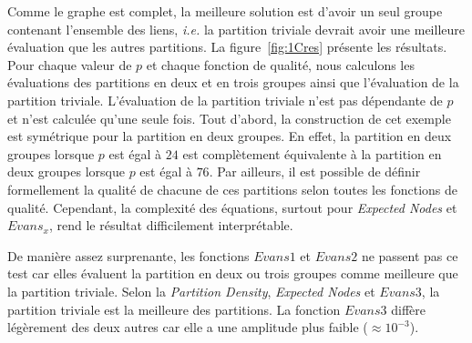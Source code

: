 Comme le graphe est complet, la meilleure solution est d'avoir un seul groupe contenant l'ensemble des liens, \textit{i.e.} la partition triviale devrait avoir une meilleure évaluation que les autres partitions.
La figure~\ref{fig:1Cres} présente les résultats.
Pour chaque valeur de $p$ et chaque fonction de qualité, nous calculons les évaluations des partitions en deux et en trois groupes ainsi que l'évaluation de la partition triviale.
L'évaluation de la partition triviale n'est pas dépendante de $p$ et n'est calculée qu'une seule fois.
Tout d'abord, la construction de cet exemple est symétrique pour la partition en deux groupes.
En effet, la partition en deux groupes lorsque $p$ est égal à $24$ est complètement équivalente à la partition en deux groupes lorsque $p$ est égal à $76$.
Par ailleurs, il est possible de définir formellement la qualité de  chacune de ces partitions selon toutes les fonctions de qualité.
Cependant, la complexité des équations, surtout pour \emph{Expected Nodes} et $Evans_x$, rend le résultat difficilement interprétable.


De manière assez surprenante, les fonctions $Evans1$ et $Evans2$ ne passent pas ce test car elles évaluent la partition en deux ou trois groupes comme meilleure que la partition triviale.
Selon la \emph{Partition Density}, \emph{Expected Nodes} et $Evans3$, la partition triviale est la meilleure des partitions.
La fonction $Evans3$ diffère légèrement des deux autres car elle a une amplitude plus faible ($\approx 10^{-3}$).


